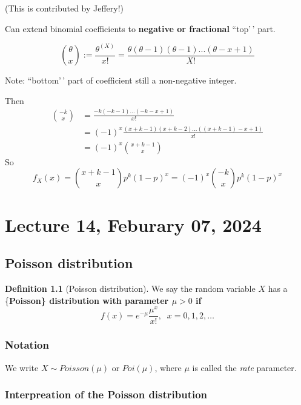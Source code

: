 \documentclass[
]{book}
\theoremstyle{definition}
\newtheorem{definition}{Definition}[chapter]
\theoremstyle{definition}
\theoremstyle{definition}
\theoremstyle{definition}
\theoremstyle{remark}
\begin{document}
(This is contributed by Jeffery!)

Can extend binomial coefficients to \textbf{negative or fractional} ``top'\,' part.

\[\binom{\theta}{x} := \frac{\theta^{(X)}}{x!} = \frac{\theta(\theta-1)(\theta-1)...(\theta-x+1)}{X!}\]

Note: ``bottom'\,' part of coefficient still a non-negative integer.

Then
\begin{align*}
    \binom{-k}{x} 
        & = \frac{-k(-k-1)...(-k-x+1)}{x!} \\
        & = (-1)^x \frac{(x+k-1)(x+k-2)...((x+k-1)-x+1)}{x!}\\
        & = (-1)^x \binom{x+k-1}{x}
\end{align*}
So
\[
    f_X(x) = \binom{x+k-1}{x}p^k(1-p)^x = (-1)^x \binom{-k}{x} p^k(1-p)^x 
\]

\hypertarget{lecture-14-feburary-07-2024}{%
\chapter{Lecture 14, Feburary 07, 2024}\label{lecture-14-feburary-07-2024}}

\hypertarget{poisson-distribution}{%
\section{Poisson distribution}\label{poisson-distribution}}

\begin{definition}[Poisson distribution]
We say the random variable \(X\) has a \{\bf Poisson\} distribution with parameter \(\mu > 0\) if
\[
f(x) = e^{-\mu} \frac{ \mu^x}{x!},\;\;x=0,1,2,\dots\]
\end{definition}

\hypertarget{notation}{%
\subsection{Notation}\label{notation}}

We write \(X\sim Poisson(\mu)\) or \(Poi(\mu)\), where \(\mu\) is called the \emph{rate} parameter.

\hypertarget{interpreation-of-the-poisson-distribution}{%
\subsection{Interpreation of the Poisson distribution}\label{interpreation-of-the-poisson-distribution}}
\end{document}
